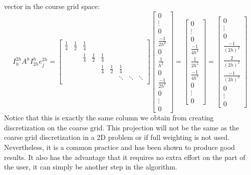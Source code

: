 \documentclass[11pt]{article}
\begin{document}
vector in the course grid space: \[
I_{h}^{2h} A^{h} I_{2h}^h e_j^{2h} =
\begin{bmatrix}
  \frac{1}{4} & \frac{1}{2} & \frac{1}{4} & & & & & & \\
  & & \frac{1}{4} & \frac{1}{2} & \frac{1}{4} & & & &  \\
  & & & & \frac{1}{4} & \frac{1}{2} & \frac{1}{4} & &  \\
  & & & &             &             & \ddots          & \ddots & \ddots \\
\end{bmatrix}
\begin{bmatrix}
  0 \\ \vdots \\ 0 \\ \frac{-1}{2h^2} \\ 0 \\ \frac{1}{h^2} \\ 0 \\ \frac{-1}{2h^2} \\ 0 \\ \vdots \\ 0
\end{bmatrix}
=
\begin{bmatrix}
  0 \\ \vdots \\ 0 \\ \frac{-1}{4h^2} \\ \frac{1}{2h^2} \\ \frac{-1}{4h^2} \\ 0 \\ \vdots \\ 0
\end{bmatrix}
=
\begin{bmatrix}
  0 \\ \vdots \\ 0 \\ \frac{-1}{(2h)^2} \\ \frac{2}{(2h)^2} \\ \frac{-1}{(2h)^2} \\ 0 \\ \vdots \\ 0
\end{bmatrix}
\] Notice that this is exactly the same column we obtain from creating
discretization on the coarse grid. This projection will not be the same
as the coarse grid discretization in a 2D problem or if full weighting
is not used. Nevertheless, it is a common practice and has been shown to
produce good results. It also has the advantage that it requires no
extra effort on the part of the user, it can simply be another step in
the algorithm.
\end{document}
